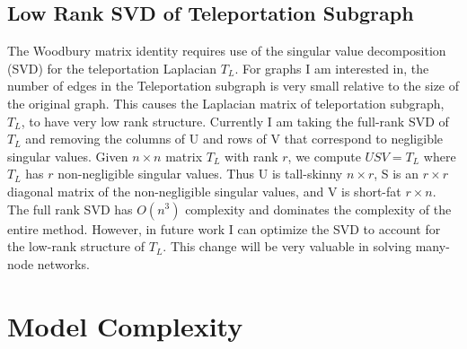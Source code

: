 \documentclass{article}
\begin{document}
\subsection{Low Rank SVD of Teleportation Subgraph}
The Woodbury matrix identity requires use of the singular value decomposition (SVD) for the teleportation Laplacian $T_L$. For graphs I am interested in, the number of edges in the Teleportation subgraph is very small relative to the size of the original graph. This causes the Laplacian matrix of teleportation subgraph, $T_L$, to have very low rank structure. Currently I am taking the full-rank SVD of $T_L$ and removing the columns of U and rows of V that correspond to negligible singular values. Given $n\times n$ matrix $T_L$ with rank $r$, we compute $USV = T_L$ where $T_L$ has $r$ non-negligible singular values. Thus U is tall-skinny $n\times r$, S is an $r\times r$ diagonal matrix of the non-negligible singular values, and V is short-fat $r\times n$. The full rank SVD has $O(n^3)$ complexity and dominates the complexity of the entire method. However, in future work I can optimize the SVD to account for the low-rank structure of $T_L$. This change will be very valuable in solving many-node networks.

\section{Model Complexity}
\end{document}
